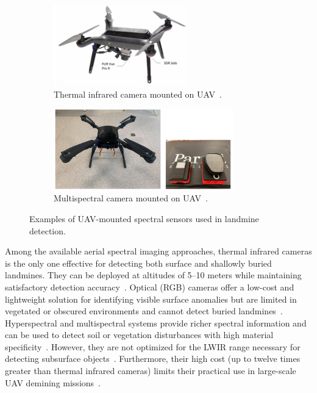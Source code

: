 \begin{figure}[h!]
    \centering
    \begin{subfigure}[b]{0.48\linewidth}
        \centering
        \includegraphics[height=3.5cm]{figs/Huirui/thermal_camera_drone.png}
        \caption{Thermal infrared camera mounted on UAV~\cite{nikulin2018detection}.}
        \label{fig:thermal_camera_drone}
    \end{subfigure}
    \hfill
    \begin{subfigure}[b]{0.48\linewidth}
        \centering
        \includegraphics[height=3.5cm]{figs/Huirui/multispectral_drone.png}
        \caption{Multispectral camera mounted on UAV~\cite{qiu2023joint}.}
        \label{fig:optical_camera_drone}
    \end{subfigure}
    \caption[UAV platforms with spectral sensors for landmine detection]{Examples of UAV-mounted spectral sensors used in landmine detection.}
    \label{fig:spectral_camera_drones}
\end{figure}

Among the available aerial spectral imaging approaches, thermal infrared cameras is the only one effective for detecting both surface and shallowly buried landmines. They can be deployed at altitudes of 5--10 meters while maintaining satisfactory detection accuracy~\cite{TENORIOTAMAYO2024105567,rs15040967}. Optical (RGB) cameras offer a low-cost and lightweight solution for identifying visible surface anomalies but are limited in vegetated or obscured environments and cannot detect buried landmines~\cite{Baur2021HowTI,6842242,rs16122046}. Hyperspectral and multispectral systems provide richer spectral information and can be used to detect soil or vegetation disturbances with high material specificity~\cite{10765909}. However, they are not optimized for the \gls{LWIR} range necessary for detecting subsurface objects~\cite{ptsa-qj43-23}. Furthermore, their high cost (up to twelve times greater than thermal infrared cameras) limits their practical use in large-scale \gls{UAV} demining missions~\cite{rs15040967}.



